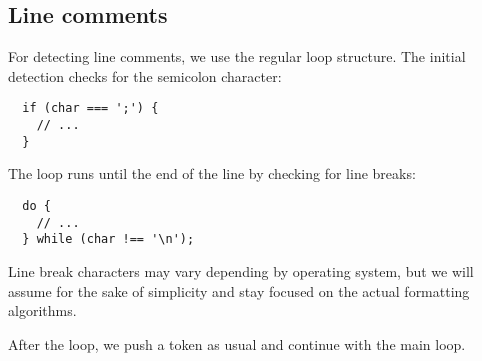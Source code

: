 \subsection{Line comments}
For detecting line comments, we use the regular loop structure.
The initial detection checks for the semicolon character:
\begin{verbatim}
  if (char === ';') {
    // ...
  }
\end{verbatim}

The loop runs until the end of the line by checking for line breaks:
\begin{verbatim}
  do {
    // ...
  } while (char !== '\n');
\end{verbatim}
Line break characters may vary depending by operating system,
but we will assume \code{\n} for the sake of simplicity
and stay focused on the actual formatting algorithms.

After the loop, we push a token as usual and continue with the main loop.
